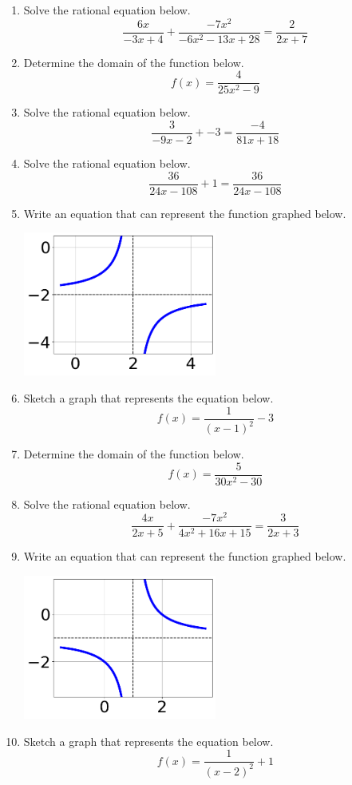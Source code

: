 \documentclass[14pt]{extbook}
\begin{document}
\begin{enumerate}
\item{
Solve the rational equation below.\[ \frac{6x}{-3x + 4} + \frac{-7x^{2}}{-6x^{2} -13 x + 28} = \frac{2}{2x + 7} \]} \newpage
\item{
Determine the domain of the function below.\[ f(x) = \frac{4}{25x^{2} -9} \]} \newpage
\item{
Solve the rational equation below.\[ \frac{3}{-9x -2} + -3 = \frac{-4}{81x + 18} \]} \newpage
\item{
Solve the rational equation below.\[ \frac{36}{24x -108} + 1 = \frac{36}{24x -108} \]} \newpage
\item{
Write an equation that can represent the function graphed below.
\begin{center}
    \includegraphics[width=0.5\textwidth]{../Figures/rationalGraphToEquationA.png}
\end{center}
} \newpage
\item{
Sketch a graph that represents the equation below.\[ f(x) = \frac{1}{(x - 1)^2} - 3 \]} \newpage
\item{
Determine the domain of the function below.\[ f(x) = \frac{5}{30x^{2} -30} \]} \newpage
\item{
Solve the rational equation below.\[ \frac{4x}{2x + 5} + \frac{-7x^{2}}{4x^{2} +16 x + 15} = \frac{3}{2x + 3} \]} \newpage
\item{
Write an equation that can represent the function graphed below.
\begin{center}
    \includegraphics[width=0.5\textwidth]{../Figures/rationalGraphToEquationCopyA.png}
\end{center}
} \newpage
\item{
Sketch a graph that represents the equation below.\[ f(x) = \frac{1}{(x - 2)^2} + 1 \]} \newpage
\end{enumerate}
\end{document}
